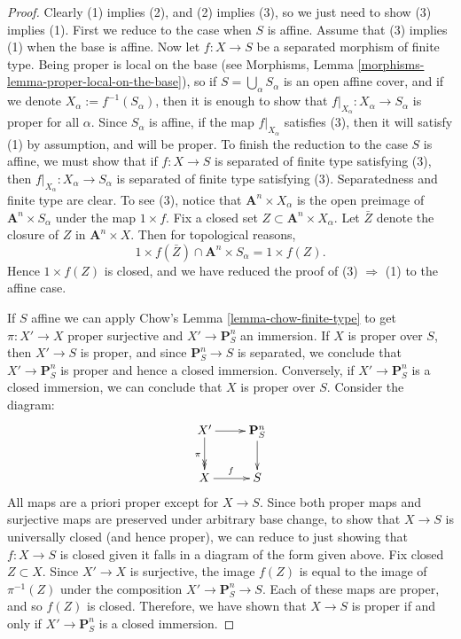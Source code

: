 \begin{proof}
Clearly (1) implies (2), and (2) implies (3), so we just need to show (3)
implies (1).
First we reduce to the case when $S$ is affine.  Assume that (3) implies (1)
when the base is affine.  Now let $f: X \to S$ be a separated morphism of 
finite type.  Being proper is local on the base
(see Morphisms, Lemma \ref{morphisms-lemma-proper-local-on-the-base}), so if 
$S = \bigcup_\alpha S_\alpha$ is an open affine cover, and if
we denote $X_\alpha := f^{-1}(S_\alpha)$, then it is
enough to show that $f|_{X_\alpha}: X_\alpha \to S_\alpha$ is proper
for all $\alpha$.  Since $S_\alpha$ is affine, if
the map $f|_{X_\alpha}$ satisfies (3), then it will satisfy (1)
by assumption, and will be proper.  To finish the reduction to the
case $S$ is affine, we must show that if $f: X \to S$ is separated of
finite type satisfying (3), then $f|_{X_\alpha}:X_\alpha \to S_\alpha$
is separated of finite type satisfying (3).  Separatedness and finite
type are clear.  To see (3), notice that
$\mathbf{A}^n \times X_\alpha$ is the open preimage of
$\mathbf{A}^n \times S_\alpha$ under the map $1 \times f$.  Fix a closed
set $Z \subset \mathbf A^n \times X_\alpha$.  Let $\bar Z$ denote the
closure of $Z$ in $\mathbf{A}^n \times X$.  Then for topological
reasons,
$$
1 \times f(\bar Z) \cap \mathbf{A}^n \times S_\alpha  = 1 \times f(Z).
$$
Hence $1 \times f(Z)$ is closed, and we have reduced the proof of
(3) $\Rightarrow$ (1) to the affine case.

\medskip\noindent
If $S$ affine we can apply
Chow's Lemma \ref{lemma-chow-finite-type}
 to get $\pi : X' \to X$ proper surjective and $X' \to \mathbf{P}^n_S$
an immersion.  
If $X$ is proper over $S$, then $X' \to S$ is proper, and since
$\mathbf{P}^n_S \to S$ is separated, we conclude that $X' \to
\mathbf{P}^n_S$ is proper and hence a closed immersion.  Conversely,
if $X' \to \mathbf{P}^n_S$ is a closed immersion, we can conclude that
$X$ is proper over $S$.  Consider the diagram:
\begin{equation}
  \xymatrix{
    X' \ar[r] \ar@{->>}[d]_{\pi} &
    \mathbf{P}^n_S \ar[d] \\
    X \ar[r]^f & S\\
  }
\end{equation}
All maps are a priori proper except for $X \to S$.  Since both proper
maps and surjective maps
are preserved under arbitrary base change, to show that $X \to S$ is
universally closed (and hence proper), we can reduce to just showing
that $f: X \to S$ is closed given it falls in a diagram of the form given
above.  Fix closed $Z \subset X$.  Since $X' \to X$ is surjective,
the image $f(Z)$ is equal to the image of $\pi^{-1}(Z)$ under the
composition  $X' \to \mathbf{P}^n_S \to S$.  Each of these maps are
proper, and so $f(Z)$ is closed.  Therefore, we have shown that 
$X \to S$ is proper if and only if $X' \to \mathbf{P}^n_S$ is a closed
immersion.  


\end{proof}
